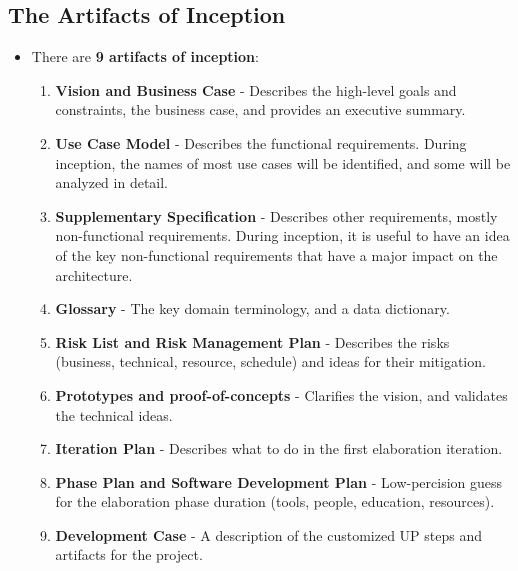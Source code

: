 \documentclass[16pt]{article}
\begin{document}
    \subsection*{The Artifacts of Inception}
    \begin{itemize}
        \item There are \textbf{9 artifacts of inception}:
        \begin{enumerate}
            \item \textbf{Vision and Business Case} - Describes the high-level goals and constraints, the business case, and provides an executive summary.
            \item \textbf{Use Case Model} - Describes the functional requirements. During inception, the names of most use cases will be identified, and some will be analyzed in detail.
            \item \textbf{Supplementary Specification} - Describes other requirements, mostly non-functional requirements. During inception, it is useful to have an idea of the key non-functional requirements that have a major impact on the architecture.
            \item \textbf{Glossary} - The key domain terminology, and a data dictionary.
            \item \textbf{Risk List and Risk Management Plan} - Describes the risks (business, technical, resource, schedule) and ideas for their mitigation.
            \item \textbf{Prototypes and proof-of-concepts} - Clarifies the vision, and validates the technical ideas.
            \item \textbf{Iteration Plan} - Describes what to do in the first elaboration iteration.
            \item \textbf{Phase Plan and Software Development Plan} - Low-percision guess for the elaboration phase duration (tools, people, education, resources).
            \item \textbf{Development Case} - A description of the customized UP steps and artifacts for the project.
        \end{enumerate}
    \end{itemize}
\end{document}
